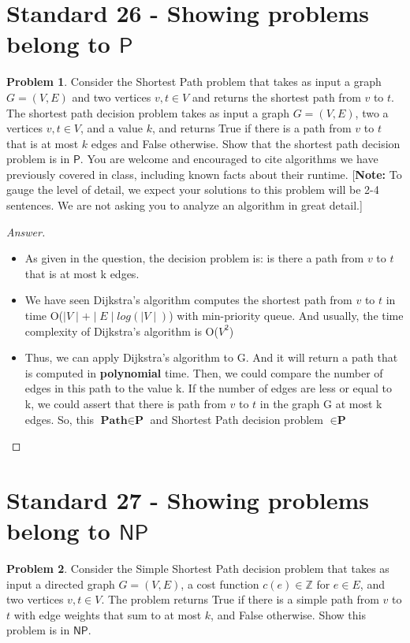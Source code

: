 \documentclass[11pt]{article}
\theoremstyle{definition}
\theoremstyle{definition}
\newtheorem{required}{Problem}
\theoremstyle{definition}
\begin{document}
\newpage
\section{Standard 26 - Showing problems belong to $\textsf{P}$}
\begin{required} \label{InP}
Consider the Shortest Path problem that takes as input a graph $G=(V,E)$
and two vertices $v,t\in V$ and returns the shortest path from $v$ to $t$.
The shortest path decision problem takes as input a graph $G=(V,E)$, two a
vertices $v,t\in V$, and a value $k$, and returns True if there is a path from
$v$ to $t$ that is at most $k$ edges and False otherwise. Show that the
shortest path decision problem is in $\textsf{P}$. You are welcome and
encouraged to cite algorithms we have previously covered in class, including
known facts about their runtime.  [\textbf{Note:} To gauge the level of
detail, we expect your solutions to this problem will be 2-4 sentences. We are
not asking you to analyze an algorithm in great detail.]

\end{required}
\begin{proof}[Answer]
\begin{itemize}
\item As given in the question, the decision problem is: is there a path from $v$ to $t$ that is at most k edges.

\item We have seen Dijkstra’s algorithm computes the shortest path from $v$ to $t$ in time O($\mid V\mid + \mid E \mid log(\mid V \mid)$) with min-priority queue. And usually, the time complexity of Dijkstra's algorithm is O($V^2$)

\item Thus, we can apply Dijkstra's algorithm to G. And it will return a path that is computed in \textbf{polynomial} time. Then, we could compare the number of edges in this path to the value k. If the number of edges are less or equal to k, we could assert that there is path from $v$ to $t$ in the graph G at most k edges. So, this $\textbf{Path} \in \textbf{P}$ and Shortest Path decision problem $ \in \textbf{P}$
\end{itemize}
\end{proof}


\newpage
\section{Standard 27 - Showing problems belong to $\textsf{NP}$}
\begin{required} \label{InNP}
Consider the Simple Shortest Path decision problem that takes as input a
directed graph $G=(V,E)$, a cost function $c(e)\in \mathbb{Z}$ for $e \in E$,
and two vertices $v,t\in V$. The problem returns True if there is a simple path from
$v$ to $t$ with edge weights that sum to at most $k$, and False otherwise.
Show this problem is in $\textsf{NP}$.
\end{required}
\end{document}
